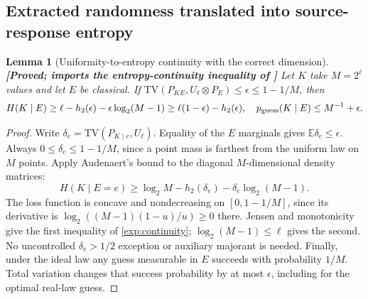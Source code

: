 \documentclass[11pt,a4paper]{article}
\newtheorem{lemma}[theorem]{Lemma}
\theoremstyle{definition}
\theoremstyle{remark}\newtheorem{remark}[theorem]{Remark}
\newcommand{\status}[1]{\textbf{[#1]}\quad}
\newcommand{\TV}{\mathrm{TV}}
\newcommand{\E}{\mathbb E}
\begin{document}
\subsection{Extracted randomness translated into source-response entropy}
\begin{lemma}[Uniformity-to-entropy continuity with the correct dimension]\label{exp:Audenaert}
\status{Proved; imports the entropy-continuity inequality of \cite{Audenaert07}}
Let $K$ take $M=2^\ell$ values and let $E$ be classical. If
$\TV(P_{KE},U_\ell\otimes P_E)\le\epsilon\le1-1/M$, then
\begin{equation}\label{exp:continuity}
 H(K\mid E)\ge\ell-h_2(\epsilon)-\epsilon\log_2(M-1)
 \ge\ell(1-\epsilon)-h_2(\epsilon),
 \quad
 p_{\rm guess}(K\mid E)\le M^{-1}+\epsilon.
\end{equation}
\end{lemma}
\begin{proof}
Write $\delta_e=\TV(P_{K\mid e},U_\ell)$. Equality of the $E$ marginals gives $\E\delta_e\le\epsilon$. Always $0\le\delta_e\le1-1/M$, since a point mass is farthest from the uniform law on $M$ points. Apply Audenaert's bound to the diagonal $M$-dimensional density matrices:
\[
 H(K\mid E=e)\ge\log_2M-h_2(\delta_e)-\delta_e\log_2(M-1).
\]
The loss function is concave and nondecreasing on $[0,1-1/M]$, since its derivative is
$\log_2((M-1)(1-u)/u)\ge0$ there. Jensen and monotonicity give the first inequality of \eqref{exp:continuity}; $\log_2(M-1)\le\ell$ gives the second. No uncontrolled $\delta_e>1/2$ exception or auxiliary majorant is needed. Finally, under the ideal law any guess measurable in $E$ succeeds with probability $1/M$. Total variation changes that success probability by at most $\epsilon$, including for the optimal real-law guess.
\end{proof}
\end{document}
